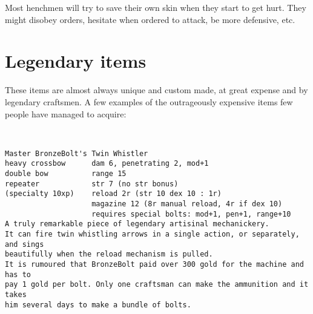 Most henchmen will try to save their own skin when they start to get hurt. They might disobey orders, hesitate when ordered to attack, be more defensive, etc.









\section*{Legendary items}


These items are almost always unique and custom made, at great expense and by legendary craftsmen. A few examples of the outrageously expensive items few people have managed to acquire:

\

\small \begin{samepage} \begin{verbatim}
Master BronzeBolt's Twin Whistler
heavy crossbow      dam 6, penetrating 2, mod+1
double bow          range 15
repeater            str 7 (no str bonus)
(specialty 10xp)    reload 2r (str 10 dex 10 : 1r)
                    magazine 12 (8r manual reload, 4r if dex 10)
                    requires special bolts: mod+1, pen+1, range+10
A truly remarkable piece of legendary artisinal mechanickery.
It can fire twin whistling arrows in a single action, or separately, and sings
beautifully when the reload mechanism is pulled.
It is rumoured that BronzeBolt paid over 300 gold for the machine and has to
pay 1 gold per bolt. Only one craftsman can make the ammunition and it takes
him several days to make a bundle of bolts.
\end{verbatim} \end{samepage} \normalsize


